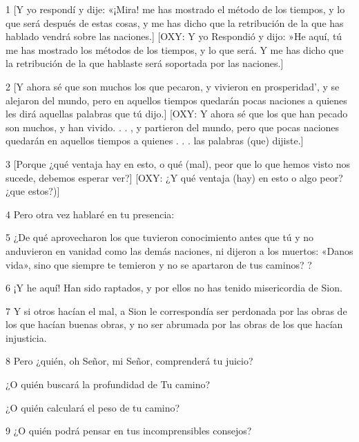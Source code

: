 \par 1 [Y yo respondí y dije: «¡Mira! me has mostrado el método de los tiempos, y lo que será después de estas cosas, y me has dicho que la retribución de la que has hablado vendrá sobre las naciones.] [OXY: Y yo Respondió y dijo: »He aquí, tú me has mostrado los métodos de los tiempos, y lo que será. Y me has dicho que la retribución de la que hablaste será soportada por las naciones.]

\par 2 [Y ahora sé que son muchos los que pecaron, y vivieron en prosperidad', y se alejaron del mundo, pero en aquellos tiempos quedarán pocas naciones a quienes les dirá aquellas palabras que tú dijo.] [OXY: Y ahora sé que los que han pecado son muchos, y han vivido. . . , y partieron del mundo, pero que pocas naciones quedarán en aquellos tiempos a quienes . . . las palabras (que) dijiste.]

\par 3 [Porque ¿qué ventaja hay en esto, o qué (mal), peor que lo que hemos visto nos sucede, debemos esperar ver?] [OXY: ¿Y qué ventaja (hay) en esto o algo peor? ¿que estos?)]

\par 4 Pero otra vez hablaré en tu presencia:

\par 5 ¿De qué aprovecharon los que tuvieron conocimiento antes que tú y no anduvieron en vanidad como las demás naciones, ni dijeron a los muertos: «Danos vida», sino que siempre te temieron y no se apartaron de tus caminos? ?

\par 6 ¡Y he aquí! Han sido raptados, y por ellos no has tenido misericordia de Sion.

\par 7 Y si otros hacían el mal, a Sion le correspondía ser perdonada por las obras de los que hacían buenas obras, y no ser abrumada por las obras de los que hacían injusticia.

\par 8 Pero ¿quién, oh Señor, mi Señor, comprenderá tu juicio?

\par ¿O quién buscará la profundidad de Tu camino?

\par ¿O quién calculará el peso de tu camino?

\par 9 ¿O quién podrá pensar en tus incomprensibles consejos?

